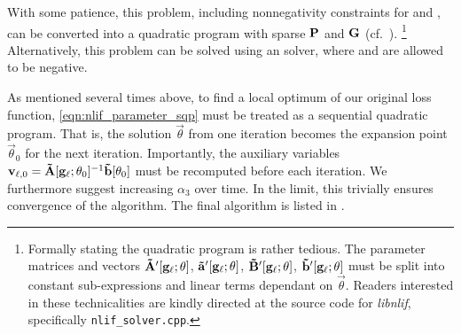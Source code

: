 With some patience, this problem, including nonnegativity constraints for \vrap and \mrAp, can be converted into a quadratic program with sparse $\mathbf{P}$ and $\mathbf{G}$ (cf.~).%
\footnote{
Formally stating the quadratic program is rather tedious.
The parameter matrices and vectors $\mathbf{\tilde A}'[\mathbf{g}_\ell; \mathbf{\theta}]$, $\mathbf{\tilde a}'[\mathbf{g}_\ell; \mathbf{\theta}]$, $\mathbf{\tilde B}'[\mathbf{g}_\ell; \mathbf{\theta}]$, $\mathbf{\tilde b}'[\mathbf{g}_\ell; \mathbf{\theta}]$ must be split into constant sub-expressions and linear terms dependant on $\vec \theta$.
Readers interested in these technicalities are kindly directed at the source code for \emph{libnlif}, specifically \texttt{nlif\_solver.cpp}.
}
Alternatively, this problem can be solved using an \NNLS solver, where \vrbp and \mrBp are allowed to be negative.

As mentioned several times above, to find a local optimum of our original loss function, \cref{eqn:nlif_parameter_sqp} must be treated as a sequential quadratic program.
That is, the solution $\vec \theta$ from one iteration becomes the expansion point $\vec \theta_0$ for the next iteration.
Importantly, the auxiliary variables $\mathbf{v}_{\ell, 0} = \mathbf{\tilde A}[\mathbf{g}_\ell; \mathbf{\theta}_0]^{-1} \mathbf{\tilde b}[\mathbf{\theta}_0]$ must be recomputed before each iteration.
We furthermore suggest increasing $\alpha_3$ over time.
In the limit, this trivially ensures convergence of the algorithm.
The final algorithm is listed in .

